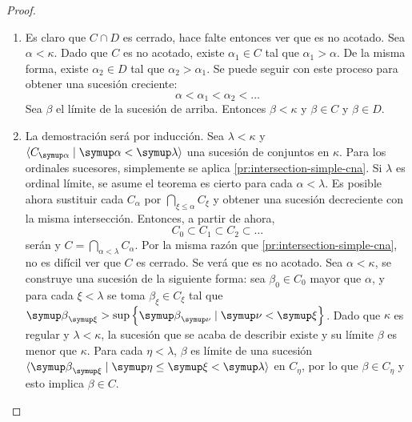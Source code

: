 \documentclass
[
  12pt,
  letterpaper,
  openany,
  oneside,
]{book}
\begin{document}
\begin{proof}\phantom{a}
    \begin{enumerate}[label=(\roman*)]
        \item\label{pr:intersection-simple-cna}
            Es claro que $C\cap D$ es cerrado, hace falte entonces ver que es no acotado.
            Sea $\alpha<\kappa$. Dado que $C$ es no acotado, existe $\alpha_1\in C$
            tal que $\alpha_1 > \alpha$. De la misma forma, existe $\alpha_2\in D$
            tal que $\alpha_2 > \alpha_1$. Se puede seguir con este proceso para obtener
            una sucesión creciente:
            \[
                \alpha < \alpha_1 < \alpha_2 < \dots
            \]
            Sea $\beta$ el límite de la sucesión de arriba.
            Entonces $\beta < \kappa$ y $\beta\in C$ y $\beta\in D$.


        \item\label{pr:intersection-cna}
            La demostración será por inducción.
            Sea $\lambda<\kappa$ y $\seq{C_\alpha\mid\alpha<\lambda}$
            una sucesión de conjuntos \cna{} en $\kappa$.
            Para los ordinales sucesores, simplemente se aplica
            \ref{pr:intersection-simple-cna}.
            Si $\lambda$ es ordinal límite, se asume el teorema
            es cierto para cada $\alpha<\lambda$. Es posible ahora sustituir
            cada $C_\alpha$ por $\bigcap_{\xi\leq\alpha} C_\xi$ y obtener
            una sucesión decreciente con la misma intersección. Entonces, a partir de ahora,
            \[
                C_0 \subset C_1 \subset C_2 \subset \dots
            \]
            serán \cna{} y $C = \bigcap_{\alpha<\lambda} C_\alpha$.
            Por la misma razón que \ref{pr:intersection-simple-cna}, no es difícil
            ver que $C$ es cerrado. Se verá que es no acotado. Sea $\alpha<\kappa$,
            se construye una sucesión de la siguiente forma: sea $\beta_0\in C_0$ mayor que
            $\alpha$, y para cada $\xi<\lambda$ se toma $\beta_\xi\in C_\xi$
            tal que $\beta_\xi > \sup\set{\beta_\nu\mid\nu<\xi}$.
            Dado que $\kappa$ es regular y $\lambda<\kappa$, la sucesión que se acaba de
            describir existe y su límite $\beta$ es menor que $\kappa$.
            Para cada $\eta<\lambda$, $\beta$ es límite de una sucesión
            $\seq{\beta_\xi\mid\eta\leq\xi<\lambda}$ en $C_\eta$, por lo que
            $\beta\in C_\eta$ y esto implica $\beta\in C$.



\end{enumerate}
\end{proof}
\end{document}
